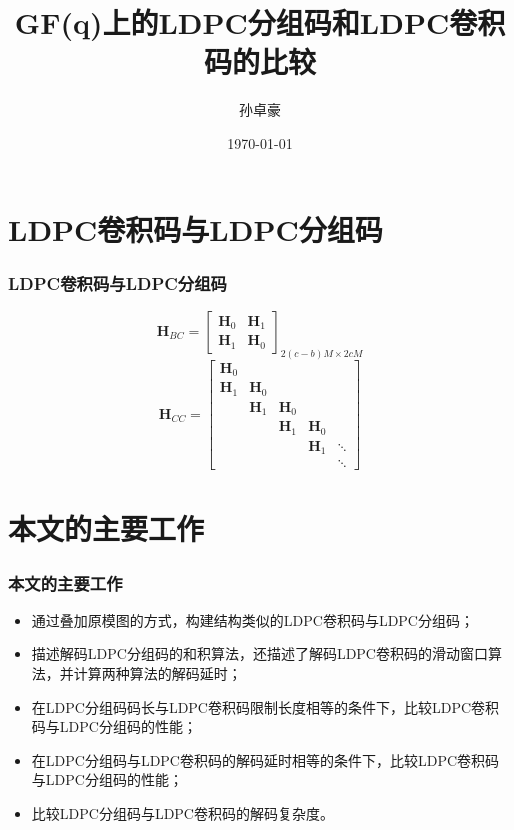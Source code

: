 \documentclass{beamer}
\title{GF(q)上的LDPC分组码和LDPC卷积码的比较}
\author{孙卓豪}
\institute{南开大学 \& 电子信息科学与技术}
\date{\today}
\begin{document}
\usetikzlibrary{shapes,snakes}
\usetikzlibrary{arrows, decorations.markings}
\begin{frame}
	\titlepage
\end{frame}

\begin{frame}
	\tableofcontents
\end{frame}

\section{LDPC卷积码与LDPC分组码}
\begin{frame}[shrink]
\frametitle{LDPC卷积码与LDPC分组码}
\begin{equation*}
    \mathbf{H}_{BC} = \left[
          \begin{array}{cc}
            \mathbf{H}_0 & \mathbf{H}_1\\
            \mathbf{H}_1 & \mathbf{H}_0
          \end{array} \right]_{2(c-b)M \times 2cM}
\end{equation*}
	\begin{equation*}
    \mathbf{H}_{CC} = \left[
          \begin{array}{ccccc}
            \mathbf{H}_0 & & & & \\
            \mathbf{H}_1 & \mathbf{H}_0 & & & \\
             & \mathbf{H}_1 & \mathbf{H}_0 & & \\
             & & \mathbf{H}_1 & \mathbf{H}_0 & \\
             & & & \mathbf{H}_1 & \ddots \\
             & & & & \ddots
          \end{array} \right]
\end{equation*}
\end{frame}

\section{本文的主要工作}
\begin{frame}[shrink]
\frametitle{本文的主要工作}
    \begin{itemize}
        \item 通过叠加原模图的方式，构建结构类似的LDPC卷积码与LDPC分组码；
        \item 描述解码LDPC分组码的和积算法，还描述了解码LDPC卷积码的滑动窗口算法，并计算两种算法的解码延时；
        \item 在LDPC分组码码长与LDPC卷积码限制长度相等的条件下，比较LDPC卷积码与LDPC分组码的性能；
        \item 在LDPC分组码与LDPC卷积码的解码延时相等的条件下，比较LDPC卷积码与LDPC分组码的性能；
        \item 比较LDPC分组码与LDPC卷积码的解码复杂度。
    \end{itemize}
\end{frame}
\end{document}
